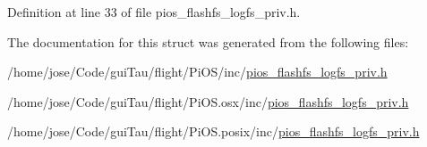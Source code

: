Definition at line 33 of file pios\-\_\-flashfs\-\_\-logfs\-\_\-priv.\-h.



The documentation for this struct was generated from the following files\-:\begin{DoxyCompactItemize}
\item 
/home/jose/\-Code/gui\-Tau/flight/\-Pi\-O\-S/inc/\hyperlink{inc_2pios__flashfs__logfs__priv_8h}{pios\-\_\-flashfs\-\_\-logfs\-\_\-priv.\-h}\item 
/home/jose/\-Code/gui\-Tau/flight/\-Pi\-O\-S.\-osx/inc/\hyperlink{osx_2inc_2pios__flashfs__logfs__priv_8h}{pios\-\_\-flashfs\-\_\-logfs\-\_\-priv.\-h}\item 
/home/jose/\-Code/gui\-Tau/flight/\-Pi\-O\-S.\-posix/inc/\hyperlink{posix_2inc_2pios__flashfs__logfs__priv_8h}{pios\-\_\-flashfs\-\_\-logfs\-\_\-priv.\-h}\end{DoxyCompactItemize}
